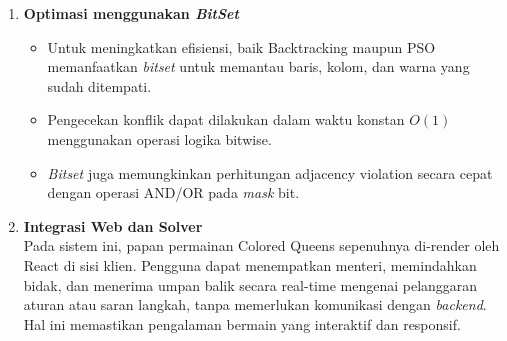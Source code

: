 \documentclass[a4paper,twoside]{article}
\begin{document}
\begin{enumerate}
\begin{enumerate}[label=\arabic*.]
		Maka $x + (v + 1) = [2,4,3,4]$
		\item Hitung fitness untuk kondisi partikel sekarang berdasarkan posisi bidak menteri:
		\begin{itemize}
			\item Bidak 1 → $(2,1)$\\
			Adjacency Violation dengan Bidak 2
			\item Bidak 2 → $(1,2)$\\
			Adjacency Violation dengan Bidak 1 \\
			Attacking Violation dengan bidak 3
			\item Bidak 3 → $(4,2)$\\
			Attacking Violation dengan bidak 2
			\item Bidak 4 → $(3,4)$\\
			Maka fitness partikel ini adalah:
			\[
			\text{fitness} = 2 \cdot 2 + 1 \cdot 2 = 6
			\]
		\end{itemize}
		\item Evaluasi pBest dan nBest
		\begin{itemize}
			\item Fitness pBest = 10 
			\item Fitness nBest = 8
			\item Current Fitness = 6
			
			Karena current fitness < nbest, kedua pBest dan nBest ditukar dengan partikel sekarang. Sehingga nBest = pBest = $[0.21,0.75,0.28,0.82]$ dan Fitness nBest = Fitness pBest = 6
		\end{itemize}
		
	\end{enumerate}
	
	\item \textbf{Optimasi menggunakan \textit{BitSet}}
	\begin{itemize}
		\item Untuk meningkatkan efisiensi, baik Backtracking maupun PSO memanfaatkan \textit{bitset} untuk memantau baris, kolom, dan warna yang sudah ditempati.
		\item Pengecekan konflik dapat dilakukan dalam waktu konstan $O(1)$ menggunakan operasi logika bitwise.
		\item \textit{Bitset} juga memungkinkan perhitungan adjacency violation secara cepat dengan operasi AND/OR pada \textit{mask} bit.
	\end{itemize}
	
	\item \textbf{Integrasi Web dan Solver} \\
	Pada sistem ini, papan permainan Colored Queens sepenuhnya di-render oleh React di sisi klien. Pengguna dapat menempatkan menteri, memindahkan bidak, dan menerima umpan balik secara real-time mengenai pelanggaran aturan atau saran langkah, tanpa memerlukan komunikasi dengan \textit{backend}. Hal ini memastikan pengalaman bermain yang interaktif dan responsif.
	

\end{enumerate}
\end{document}

